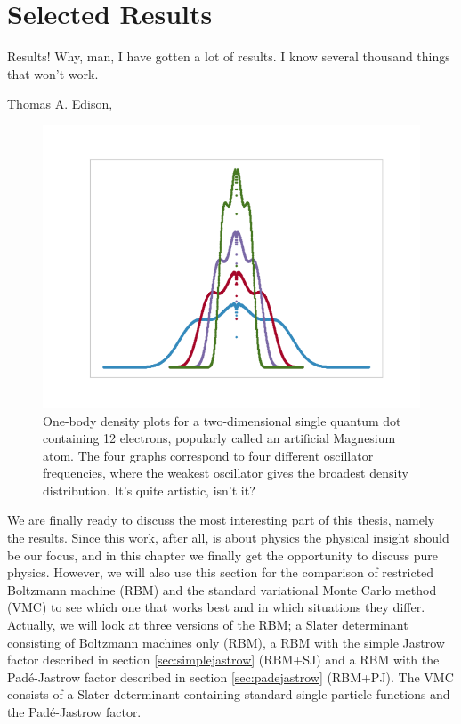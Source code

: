 \chapter{Selected Results} \label{chp:results}
\epigraph{Results! Why, man, I have gotten a lot of results. I know several thousand things that won't work.}{Thomas A. Edison, \cite{noauthor_edisonian_nodate}}
\begin{figure}[H]
	\centering
	\includegraphics[scale=0.6]{Images/art_white.png}
	\caption{One-body density plots for a two-dimensional single quantum dot containing 12 electrons, popularly called an artificial Magnesium atom. The four graphs correspond to four different oscillator frequencies, where the weakest oscillator gives the broadest density distribution. It's quite artistic, isn't it?}
\end{figure}

We are finally ready to discuss the most interesting part of this thesis, namely the results. Since this work, after all, is about physics the physical insight should be our focus, and in this chapter we finally get the opportunity to discuss pure physics. However, we will also use this section for the comparison of restricted Boltzmann machine (RBM) and the standard variational Monte Carlo method (VMC) to see which one that works best and in which situations they differ. Actually, we will look at three versions of the RBM; a Slater determinant consisting of Boltzmann machines only (RBM), a RBM with the simple Jastrow factor described in section \ref{sec:simplejastrow} (RBM+SJ) and a RBM with the Padé-Jastrow factor described in section \ref{sec:padejastrow} (RBM+PJ). The VMC consists of a Slater determinant containing standard single-particle functions and the Padé-Jastrow factor. 

